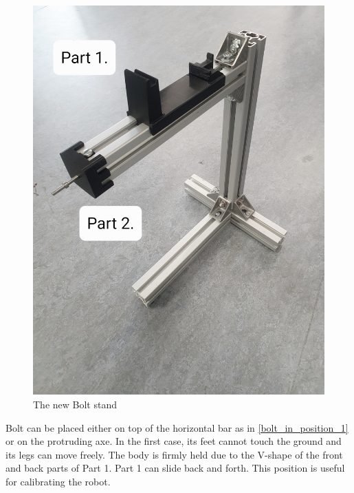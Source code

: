 \documentclass[a4paper,10pt]{article}
\begin{document}
\begin{figure}[H]
\centering
  \includegraphics[width=\linewidth, angle=0, scale=0.4]{./images/Bolt_stand_0.jpg}
  \caption{The new Bolt stand}
  \label{new_bolt_stand_1}
\end{figure}

Bolt can be placed either on top of the horizontal bar as in \ref{bolt_in_position_1} or on the protruding axe. In the first case, its feet cannot touch the ground and its legs can move freely. The body is firmly held due to the V-shape of the front and back parts of Part 1. Part 1 can slide back and forth. This position is useful for calibrating the robot.
\end{document}
